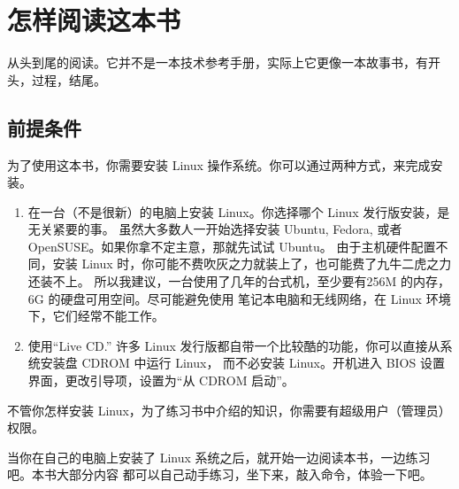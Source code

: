 \section{怎样阅读这本书} %
\label{sec:怎样阅读这本书}

从头到尾的阅读。它并不是一本技术参考手册，实际上它更像一本故事书，有开头，过程，结尾。

\subsection{前提条件} %
\label{ssub:_前提条件}
为了使用这本书，你需要安装 Linux 操作系统。你可以通过两种方式，来完成安装。
\begin{enumerate}
\item  在一台（不是很新）的电脑上安装 Linux。你选择哪个 Linux 发行版安装，是无关紧要的事。 虽然大多数人一开始选择安装 Ubuntu, Fedora, 或者 OpenSUSE。如果你拿不定主意，那就先试试 Ubuntu。 由于主机硬件配置不同，安装 Linux 时，你可能不费吹灰之力就装上了，也可能费了九牛二虎之力还装不上。 所以我建议，一台使用了几年的台式机，至少要有256M 的内存，6G 的硬盘可用空间。尽可能避免使用 笔记本电脑和无线网络，在 Linux 环境下，它们经常不能工作。

\item  使用“Live CD.” 许多 Linux 发行版都自带一个比较酷的功能，你可以直接从系统安装盘 CDROM 中运行 Linux， 而不必安装 Linux。开机进入 BIOS 设置界面，更改引导项，设置为“从 CDROM 启动”。
\end{enumerate}

\par 不管你怎样安装 Linux，为了练习书中介绍的知识，你需要有超级用户（管理员）权限。

\par 当你在自己的电脑上安装了 Linux 系统之后，就开始一边阅读本书，一边练习吧。本书大部分内容 都可以自己动手练习，坐下来，敲入命令，体验一下吧。




